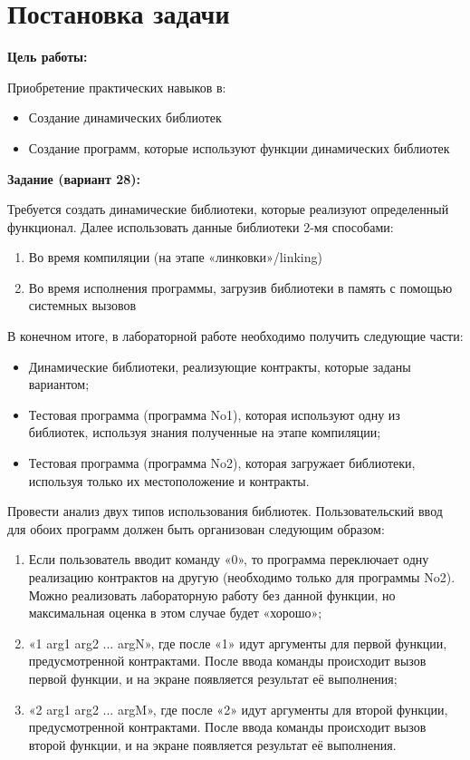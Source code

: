 \section{Постановка задачи}

{\bfseries Цель работы:} 

Приобретение практических навыков в:

\begin{itemize}
    \item Создание динамических библиотек
    \item Создание программ, которые используют функции динамических библиотек
\end{itemize}

{\bfseries Задание (вариант 28):} 

Требуется создать динамические библиотеки, которые реализуют определенный функционал. Далее использовать данные библиотеки 2-мя способами:

\begin{enumerate}
    \item Во время компиляции (на этапе «линковки»/linking)
    \item Во время исполнения программы, загрузив библиотеки в память с помощью системных вызовов
\end{enumerate}

В конечном итоге, в лабораторной работе необходимо получить следующие части:

\begin{itemize}
    \item Динамические библиотеки, реализующие контракты, которые заданы вариантом;
    \item Тестовая программа (программа No1), которая используют одну из библиотек, используя знания полученные на этапе компиляции;
    \item Тестовая программа (программа No2), которая загружает библиотеки, используя только их местоположение и контракты.
\end{itemize}

Провести анализ двух типов использования библиотек. Пользовательский ввод для обоих программ должен быть организован следующим образом:

\begin{enumerate}
    \item Если пользователь вводит команду «0», то программа переключает одну реализацию контрактов на другую (необходимо только для программы No2). Можно реализовать лабораторную работу без данной функции, но максимальная оценка в этом случае будет «хорошо»;
    \item «1 arg1 arg2 ... argN», где после «1» идут аргументы для первой функции, предусмотренной контрактами. После ввода команды происходит вызов первой функции, и на экране появляется результат её выполнения;
    \item «2 arg1 arg2 ... argM», где после «2» идут аргументы для второй функции, предусмотренной контрактами. После ввода команды происходит вызов второй функции, и на экране появляется результат её выполнения.
\end{enumerate}

